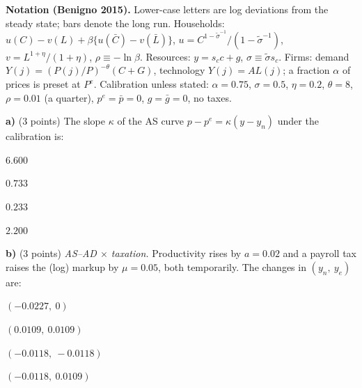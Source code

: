 \documentclass[11pt,a4paper]{article}
\begin{document}
\cabecalho

{\footnotesize\noindent\textbf{Notation (Benigno 2015).} Lower-case letters are log deviations from the
steady state; bars denote the long run. Households: $u(C)-v(L)+\beta\{u(\bar C)-v(\bar L)\}$,
$u=C^{1-\tilde\sigma^{-1}}/(1-\tilde\sigma^{-1})$, $v=L^{1+\eta}/(1+\eta)$, $\rho\equiv-\ln\beta$. Resources: $y=s_cc+g$,
$\sigma\equiv\tilde\sigma s_c$. Firms: demand $Y(j)=(P(j)/P)^{-\theta}(C+G)$, technology $Y(j)=AL(j)$; a fraction $\alpha$ of
prices is preset at $P^e$. Calibration unless stated: $\alpha=0.75$, $\sigma=0.5$, $\eta=0.2$, $\theta=8$, $\rho=0.01$ (a quarter),
$p^e=\bar p=0$, $g=\bar g=0$, no taxes.\par}



\textbf{a)} (3 points) The slope $\kappa$ of the AS curve $p-p^e=\kappa(y-y_n)$ under the calibration is:
\begin{alternativas}
\item $6.600$
\item $0.733$
\item $0.233$
\item $2.200$
\end{alternativas}
\begin{sol}
\end{sol}

\medskip
\textbf{b)} (3 points) \emph{AS--AD $\times$ taxation.} Productivity rises by $a=0.02$ and a payroll tax raises the (log) markup
by $\mu=0.05$, both temporarily. The changes in $(y_n,\ y_e)$ are:
\begin{alternativas}
\item $(-0.0227,\ 0)$
\item $(0.0109,\ 0.0109)$
\item $(-0.0118,\ -0.0118)$
\item $(-0.0118,\ 0.0109)$
\end{alternativas}
\begin{sol}
\end{sol}
\end{document}

